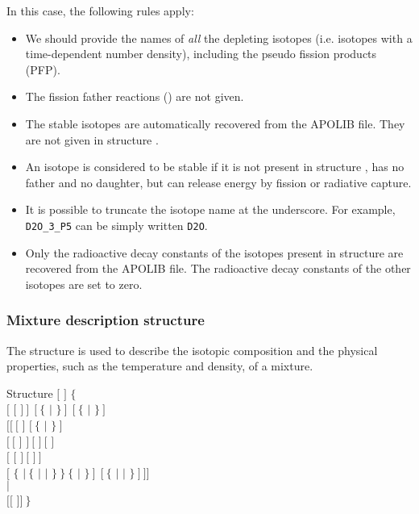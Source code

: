 \vskip 0.15cm

In this case, the following rules apply:
\begin{itemize}
\item We should provide the names  of {\sl all} the depleting
isotopes (i.e. isotopes with a time-dependent number density), including the
pseudo fission products (PFP).
\item The fission father reactions () are not given.
\item The stable isotopes are automatically recovered from the
APOLIB file. They are not given in structure .
\item An isotope is considered to be stable if it is not present in
structure , has no father and no daughter,
but can release energy by fission or radiative capture.
\item It is possible to truncate the isotope name  at the
underscore. For example, {\tt D2O\_3\_P5} can be simply written {\tt D2O}.
\item Only the radioactive decay constants of the isotopes present in
structure  are recovered from the APOLIB file. The
radioactive decay constants of the other isotopes are set to zero.
\end{itemize}

\subsubsection{Mixture description structure}\label{sect:descmix1}

The structure  is used to describe the isotopic composition and
the physical properties, such as the temperature and density, of a mixture.

\begin{DataStructure}{Structure }
 $[$  $]$ $\{$ \\
\hskip 1.0cm $[$ $[$  $]~]~~[~\{$  $|$  $\}~]~~[~\{$ 
    $|$ $\}~]$\\
\hskip 2.0cm $[[~[$  \moc{=} $]$   $[~\{$  
    $|$  $\}~]$\\
\hskip 2.0cm $[~[$  $]$  $]~[$   $]~[$   $]$ \\
\hskip 2.0cm $[$    $[$   $]~[$  $]~]$ \\
\hskip 2.0cm $[$  $\{$  $|~\{$  $|$  $|$ $\}~\}~\{$
 $|$  $\}~]~~[~\{$  $|$  $|$  $\}~]~]]$ \\
\hskip 1.0cm $|$ \\
\hskip 1.0cm  $[[$   $]]~\}$
\end{DataStructure}

